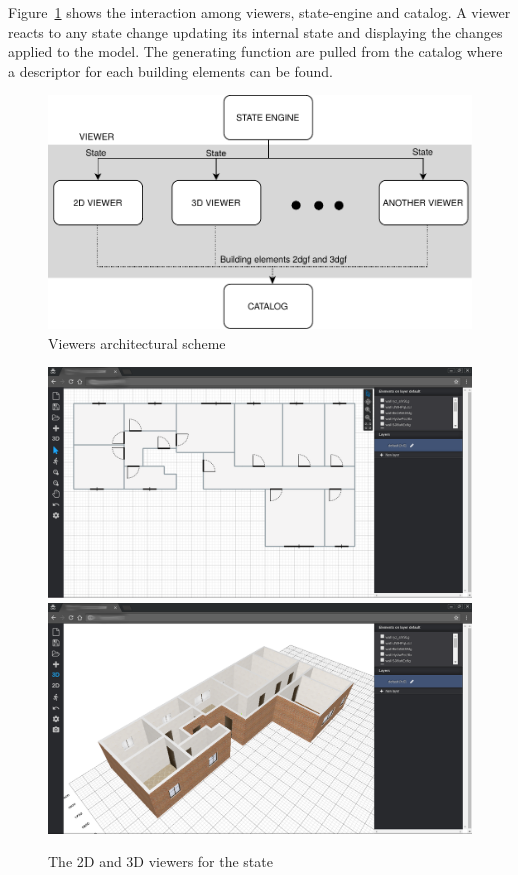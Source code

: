 Figure~\ref{fig_viewers} shows the interaction among viewers, state-engine and catalog. A viewer reacts to any state change updating its internal state and displaying the changes applied to the model. The generating function are pulled from the catalog where a descriptor for each building elements can be found.


\begin{figure}[htb]
\centering
\includegraphics[width=\linewidth]{contents/images/diagramma-visualizzatori}
\caption{Viewers architectural scheme}
\label{fig_viewers}
\end{figure}

\begin{figure}[htb]
\centering
\includegraphics[width=0.45\linewidth]{contents/images/fig-pianta}
\includegraphics[width=0.45\linewidth]{contents/images/fig-pianta-3d}
\caption{The 2D and 3D viewers for the state}
\label{fig_viewer}
\end{figure}


